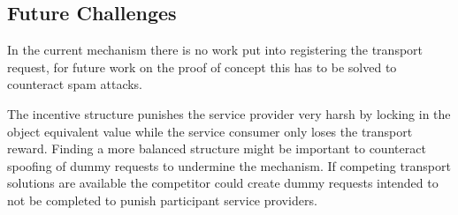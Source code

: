 \subsection{Future Challenges}

In the current mechanism there is no work put into registering the transport request, for future work on the proof of concept this has to be solved to counteract spam attacks. \par
The incentive structure punishes the service provider very harsh by locking in the object equivalent value while the service consumer only loses the transport reward. Finding a more balanced structure might be important to counteract spoofing of dummy requests to undermine the mechanism. If competing transport solutions are available the competitor could create dummy requests intended to not be completed to punish participant service providers.
%
%


